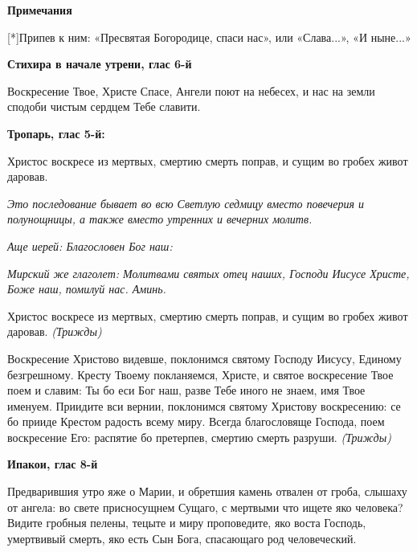 \bfseries Примечания\normalfont{}


[*]Припев к ним: «Пресвятая Богородице, спаси нас», или «Слава...», «И ныне...»


\mychapterending

 





\bfseries Стихира в начале утрени, глас 6-й\normalfont{}


Воскресение Твое, Христе Спасе, Ангели поют на небесех, и нас на земли сподоби чистым сердцем Тебе славити.





\bfseries Тропарь, глас 5-й:\normalfont{}


Христос воскресе из мертвых, смертию смерть поправ, и сущим во гробех живот даровав.





\mychapterending

 


\itshape Это последование бывает во всю Светлую седмицу вместо повечерия и полунощницы, а также вместо утренних и вечерних молитв.\normalfont{}


\itshape Аще иерей:\normalfont{} Благословен Бог наш:


\itshape Мирский же глаголет:\normalfont{} Молитвами святых отец наших, Господи Иисусе Христе, Боже наш, помилуй нас. Аминь.


Христос воскресе из мертвых, смертию смерть поправ, и сущим во гробех живот даровав. \itshape (Трижды)\normalfont{}


Воскресение Христово видевше, поклонимся святому Господу Иисусу, Единому безгрешному. Кресту Твоему покланяемся, Христе, и святое воскресение Твое поем и славим: Ты бо еси Бог наш, разве Тебе иного не знаем, имя Твое именуем. Приидите вси вернии, поклонимся святому Христову воскресению: се бо прииде Крестом радость всему миру. Всегда благословяще Господа, поем воскресение Его: распятие бо претерпев, смертию смерть разруши. \itshape (Трижды)\normalfont{}





\bfseries Ипакои, глас 8-й\normalfont{}


Предварившия утро яже о Марии, и обретшия камень отвален от гроба, слышаху от ангела: во свете присносущнем Сущаго, с мертвыми что ищете яко человека? Видите гробныя пелены, тецыте и миру проповедите, яко воста Господь, умертвивый смерть, яко есть Сын Бога, спасающаго род человеческий.





